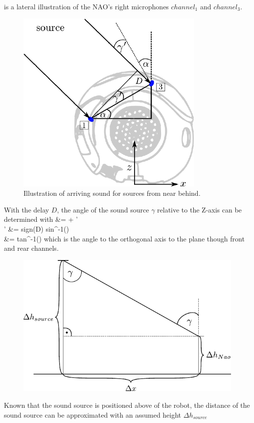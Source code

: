  is a lateral illustration of
the NAO's right microphones $channel_1$ and $channel_3$.
\begin{figure}[ht]
	\centering
		\includegraphics[width=0.45\columnwidth]{figures/side_head_tdoa}
	\caption{Illustration of arriving sound for sources from near behind.}
    \label{fig:02_headSideTdoa}
\end{figure}
With the delay $D$, the angle of the sound source $\gamma$ relative
to the Z-axis can be determined with
\bsub \bal
\gamma &= \alpha + \gamma'\\
\gamma' &= sign(D) \cdot sin^{-1}()\\
\alpha &= tan^{-1}()
\eal \esub
which is the angle to the orthogonal axis to the plane though
front and rear channels.
\begin{figure}[ht]
	\centering
		\includegraphics[width=0.6\columnwidth]{figures/x_distance}
	\caption{}
    \label{fig:02_xDistance}
\end{figure}
Known that the sound source is positioned above of the robot, the distance
of the sound source can be approximated with an assumed height $\Delta h_{source}$
